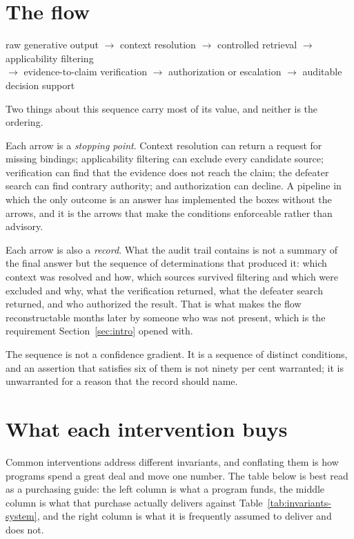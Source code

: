\section{The flow}

\begin{center}
raw generative output
$\rightarrow$ context resolution
$\rightarrow$ controlled retrieval
$\rightarrow$ applicability filtering \\
$\rightarrow$ evidence-to-claim verification
$\rightarrow$ authorization or escalation
$\rightarrow$ auditable decision support
\end{center}

Two things about this sequence carry most of its value, and neither is the ordering.

Each arrow is a \emph{stopping point}. Context resolution can return a request for
missing bindings; applicability filtering can exclude every candidate source; verification
can find that the evidence does not reach the claim; the defeater search can find contrary
authority; and authorization can decline. A pipeline in which the only outcome is an
answer has implemented the boxes without the arrows, and it is the arrows that make the
conditions enforceable rather than advisory.

Each arrow is also a \emph{record}. What the audit trail contains is not a summary of the
final answer but the sequence of determinations that produced it: which context was
resolved and how, which sources survived filtering and which were excluded and why, what
the verification returned, what the defeater search returned, and who authorized the
result. That is what makes the flow reconstructable months later by someone who was not
present, which is the requirement Section~\ref{sec:intro} opened with.

The sequence is not a confidence gradient. It is a sequence of distinct conditions, and an
assertion that satisfies six of them is not ninety per cent warranted; it is unwarranted
for a reason that the record should name.

\section{What each intervention buys}

Common interventions address different invariants, and conflating them is how programs
spend a great deal and move one number. The table below is best read as a purchasing
guide: the left column is what a program funds, the middle column is what that
purchase actually delivers against Table~\ref{tab:invariants-system}, and the right
column is what it is frequently assumed to deliver and does not.

